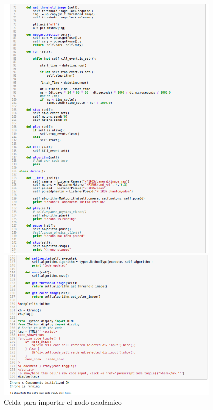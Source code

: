 \begin{figure}[H]
\begin{minipage}[h]{.48\linewidth}
    \includegraphics[width=0.98\linewidth]{figures/celda_nodo_chrono2.png}
	\end{minipage}
    \begin{minipage}[h]{.48\linewidth}
    \centering
    \includegraphics[width=0.98\linewidth]{figures/celda_nodo_chrono3.png}
	\end{minipage}
    \caption{Celda para importar el nodo académico}
		\label{fig.cnach}
\end{figure}


